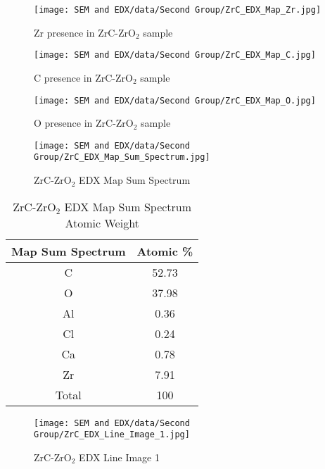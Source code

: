 \documentclass[11pt]{article}
\begin{document}
	\begin{figure}[!ht]
		\centering
		\begin{minipage}{0.33\textwidth}
			\centering
			\texttt{[image: SEM and EDX/data/Second Group/ZrC\_EDX\_Map\_Zr.jpg]}
			\caption{Zr presence in ZrC-ZrO$_2$ sample}
			\label{fig:ZrC_EDX_Map_Zr}
		\end{minipage}
		\begin{minipage}{0.33\textwidth}
			\centering
			\texttt{[image: SEM and EDX/data/Second Group/ZrC\_EDX\_Map\_C.jpg]}
			\caption{C presence in ZrC-ZrO$_2$ sample}
			\label{fig:ZrC_EDX_Map_C}
		\end{minipage}
		\begin{minipage}{0.33\textwidth}
			\centering
			\texttt{[image: SEM and EDX/data/Second Group/ZrC\_EDX\_Map\_O.jpg]}
			\caption{O presence in ZrC-ZrO$_2$ sample}
			\label{fig:ZrC_EDX_Map_O}
		\end{minipage}
	\end{figure}
	
	\begin{figure}[!ht]
		\centering
		\texttt{[image: SEM and EDX/data/Second Group/ZrC\_EDX\_Map\_Sum\_Spectrum.jpg]}
		\caption{ZrC-ZrO$_2$ EDX Map Sum Spectrum}
		\label{fig:ZrC_EDX_Map_Sum_Spectrum}
	\end{figure}
	
	\begin{table}[!ht]
		\centering
		\caption{ZrC-ZrO$_2$ EDX Map Sum Spectrum Atomic Weight}
		\begin{tabular}{cc}
			\toprule
			Map Sum Spectrum & Atomic \% \\
			\midrule
			C & 52.73 \\
			O & 37.98 \\
			Al & 0.36 \\
			Cl & 0.24 \\
			Ca & 0.78 \\
			Zr & 7.91 \\
			\midrule
			Total & 100 \\
			\bottomrule
		\end{tabular}%
		\label{tab:ZrC_EDX_Map_Atomic_Weight}%
	\end{table}%
	
	\begin{figure}[!ht]
		\centering
		\texttt{[image: SEM and EDX/data/Second Group/ZrC\_EDX\_Line\_Image\_1.jpg]}
		\caption{ZrC-ZrO$_2$ EDX Line Image 1}
		\label{fig:ZrC_EDX_Line_Image_1}
	\end{figure}
	
\end{document}
